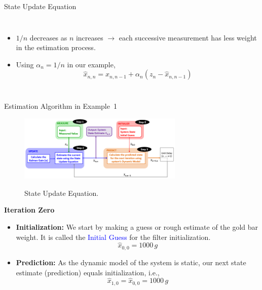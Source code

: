 \begin{frame}{State Update Equation}
\begin{columns}
\begin{itemize}
            \item $1/n$ decreases as $n$ increases $\rightarrow$ each successive measurement has less weight in the estimation process.
            
            \item Using $\alpha_n = 1/n$ in our example,
            \vspace{-3pt}
            $$\hat{x}_{n,n} = \hat{x}_{n,n-1} + \alpha_n \left(z_n - \hat{x}_{n,n-1}\right)$$
        \end{itemize}
    \end{columns}
\end{frame}
\begin{frame}{Estimation Algorithm in Example~1}
        \begin{figure}
		    \centering
		    \includegraphics[width=0.7\textwidth]{Figures/Chapter1/ex1_estimationAlgorithm.png}
		    \label{fig:ex1_estimationAlgorithm}
            \caption{State Update Equation.}
	    \end{figure}
	\textbf{Iteration Zero}    
	\begin{itemize}
	    \item \textbf{Initialization:} We start by making a guess or rough estimate of the gold bar weight. It is called the \textcolor{blue}{Initial Guess} for the filter initialization.
	    $$\hat{x}_{0,0} = 1000\,g$$
	    \item \textbf{Prediction:} As the dynamic model of the system is static, our next state estimate (prediction) equals initialization, i.e., 
	    $$\hat{x}_{1,0}=\hat{x}_{0,0} = 1000\,g$$
	\end{itemize}        
\end{frame}
